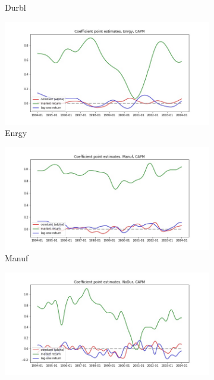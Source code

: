 \documentclass{article}
\begin{document}
\begin{figure}
\begin{subfigure}[b]{0.5\textwidth}
    \caption{Durbl}
    \label{fig:2}
  \end{subfigure}
  \begin{subfigure}[b]{0.5\textwidth}
    \centering
    \includegraphics[width=\textwidth]{Enrgy/coeffs_CAPM.jpg}
    \caption{Enrgy}
    \label{fig:2}
  \end{subfigure}
  \begin{subfigure}[b]{0.5\textwidth}
    \centering
    \includegraphics[width=\textwidth]{Manuf/coeffs_CAPM.jpg}
    \caption{Manuf}
    \label{fig:2}
  \end{subfigure}
  \begin{subfigure}[b]{0.5\textwidth}
    \centering
    \includegraphics[width=\textwidth]{NoDur/coeffs_CAPM.jpg}

\end{subfigure}
\end{figure}
\end{document}

